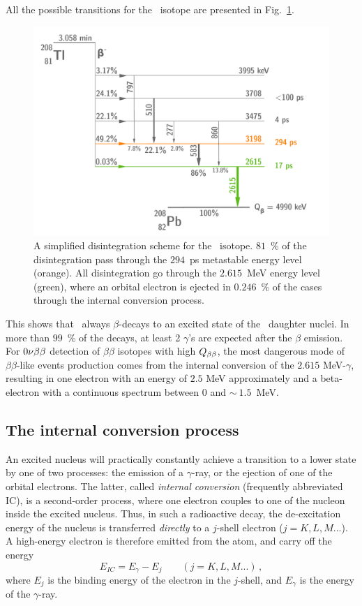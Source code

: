 All the possible transitions for the \Tl\ isotope are presented in Fig.~\ref{fig:Tl_scheme}.
\begin{figure}[!h]
  \centering
  \includegraphics[width=13cm]{timedifference/fig_timediff/Tl_decay_scheme.pdf}
  \caption{A simplified disintegration scheme for the \Tl\ isotope.
    $81$~\% of the disintegration pass through the $294$~ps metastable energy level (orange).
    All disintegration go through the $2.615$~MeV energy level (green), where an orbital electron is ejected in $0.246$~\% of the cases through the internal conversion process.
  \label{fig:Tl_scheme}}
\end{figure}
This shows that \Tl\ always $\beta$-decays to an excited state of the \Pb\ daughter nuclei.
In more than $99$~\% of the decays, at least 2 $\gamma$'s are expected after the $\beta$ emission.
For $0\nu\beta\beta$ detection of $\beta\beta$ isotopes with high $Q_{\beta\beta}$, the most dangerous mode of $\beta\beta$-like events production comes from the internal conversion of the $2.615$ MeV-$\gamma$, resulting in one electron with an energy of $2.5$ MeV approximately and a beta-electron with a continuous spectrum between $0$ and $\sim~1.5$~MeV.

\subsection{The internal conversion process}

An excited nucleus will practically constantly achieve a transition to a lower state by one of two processes: the emission of a $\gamma$-ray, or the ejection of one of the orbital electrons.
The latter, called \emph{internal conversion} (frequently abbreviated IC), is a second-order process, where one electron couples to one of the nucleon inside the excited nucleus.
Thus, in such a radioactive decay, the de-excitation energy of the nucleus is transferred \emph{directly} to a $j$-shell electron ($j=K,L,M...$).
A high-energy electron is therefore emitted from the atom, and carry off the energy
\begin{equation}
E_{IC} = E_{\gamma}-E_{j}\qquad (j=K,L,M...)\,,
\end{equation}
where $E_{j}$ is the binding energy of the electron in the $j$-shell, and $E_{\gamma}$ is the energy of the $\gamma$-ray.

